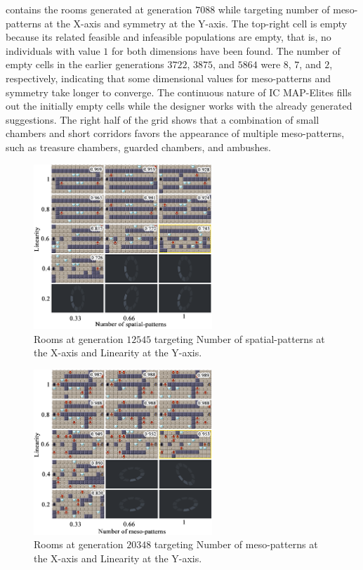  contains the rooms generated at generation $7088$ while targeting number of meso-patterns at the X-axis and symmetry at the Y-axis. The top-right cell is empty because its related feasible and infeasible populations are empty, that is, no individuals with value $1$ for both dimensions have been found. The number of empty cells in the earlier generations $3722$, $3875$, and $5864$ were $8$, $7$, and $2$, respectively, indicating that some dimensional values for meso-patterns and symmetry take longer to converge. The continuous nature of IC MAP-Elites fills out the initially empty cells while the designer works with the already generated suggestions. The right half of the grid shows that a combination of small chambers and short corridors favors the appearance of multiple meso-patterns, such as treasure chambers, guarded chambers, and ambushes.

\begin{figure}[ht!]
\centerline{\includegraphics[width=0.6\textwidth]{figure7.png}}
\caption{Rooms at generation $12545$ targeting Number of spatial-patterns at the X-axis and Linearity at the Y-axis.}
\label{figs:lin_patt}
\end{figure}

\begin{figure}[ht!]
\centerline{\includegraphics[width=0.6\textwidth]{figure8.png}}
\caption{Rooms at generation $20348$ targeting Number of meso-patterns at the X-axis and Linearity at the Y-axis.}
\label{figs:lin_meso}
\end{figure}

